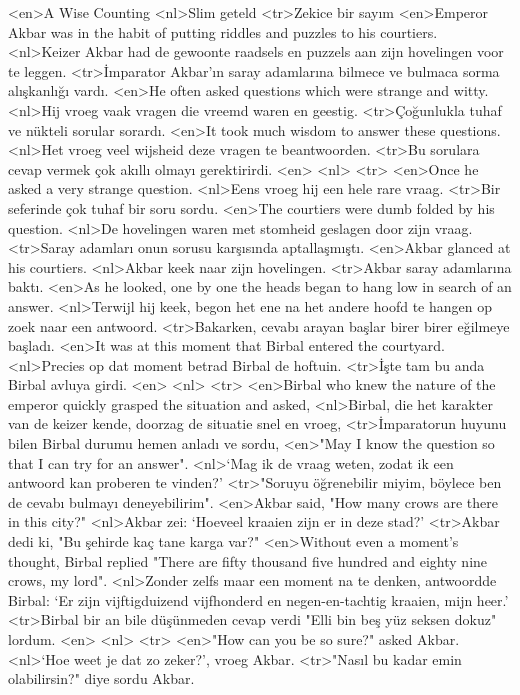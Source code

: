 <en>A Wise Counting
<nl>Slim geteld
<tr>Zekice bir sayım
<en>Emperor Akbar was in the habit of putting riddles and puzzles to his courtiers. 
<nl>Keizer Akbar had de gewoonte raadsels en puzzels aan zijn hovelingen voor te leggen. 
<tr>İmparator Akbar'ın saray adamlarına bilmece ve bulmaca sorma alışkanlığı vardı. 
<en>He often asked questions which were strange and witty. 
<nl>Hij vroeg vaak vragen die vreemd waren en geestig.
<tr>Çoğunlukla tuhaf ve nükteli sorular sorardı.
<en>It took much wisdom to answer these questions. 
<nl>Het vroeg veel wijsheid deze vragen te beantwoorden.
<tr>Bu sorulara cevap vermek çok akıllı olmayı gerektirirdi.
<en>
<nl>
<tr>
<en>Once he asked a very strange question. 
<nl>Eens vroeg hij een hele rare vraag.
<tr>Bir seferinde çok tuhaf bir soru sordu.
<en>The courtiers were dumb folded by his question. 
<nl>De hovelingen waren met stomheid geslagen door zijn vraag.
<tr>Saray adamları onun sorusu karşısında aptallaşmıştı.
<en>Akbar glanced at his courtiers. 
<nl>Akbar keek naar zijn hovelingen.
<tr>Akbar saray adamlarına baktı.
<en>As he looked, one by one the heads began to hang low in search of an answer. 
<nl>Terwijl hij keek, begon het ene na het andere hoofd te hangen op zoek naar een antwoord.
<tr>Bakarken, cevabı arayan başlar birer birer eğilmeye başladı.
<en>It was at this moment that Birbal entered the courtyard. 
<nl>Precies op dat moment  betrad Birbal de hoftuin.
<tr>İşte tam bu anda Birbal avluya girdi.
<en>
<nl>
<tr>
<en>Birbal who knew the nature of the emperor quickly grasped the situation and asked, 
<nl>Birbal, die het karakter van de keizer kende, doorzag de situatie snel en vroeg,
<tr>İmparatorun huyunu bilen Birbal durumu hemen anladı ve sordu,
<en>"May I know the question so that I can try for an answer". 
<nl>`Mag ik de vraag weten, zodat ik een antwoord kan proberen te vinden?'
<tr>"Soruyu öğrenebilir miyim, böylece ben de cevabı bulmayı deneyebilirim".
<en>Akbar said, "How many crows are there in this city?" 
<nl>Akbar zei: `Hoeveel kraaien zijn er in deze stad?'
<tr>Akbar dedi ki, "Bu şehirde kaç tane karga var?"
<en>Without even a moment's thought, Birbal replied "There are fifty thousand five hundred and eighty nine crows, my lord".
<nl>Zonder zelfs maar een moment na te denken, antwoordde Birbal: `Er zijn vijftigduizend vijfhonderd en negen-en-tachtig kraaien, mijn heer.'
<tr>Birbal bir an bile düşünmeden cevap verdi "Elli bin beş yüz seksen dokuz" lordum.
<en>
<nl>
<tr>
<en>"How can you be so sure?" asked Akbar. 
<nl>`Hoe weet je dat zo zeker?', vroeg Akbar. 
<tr>"Nasıl bu kadar emin olabilirsin?" diye sordu Akbar.
